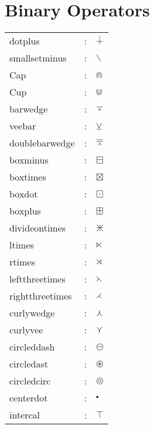 \documentclass{article}
\begin{document}
\section{Binary Operators} 
\begin{tabular}{lll} 
dotplus & : & $\dotplus$\\
smallsetminus & : & $\smallsetminus$\\
Cap & : & $\Cap$\\
Cup & : & $\Cup$\\
barwedge & : & $\barwedge$\\
veebar & : & $\veebar$\\
doublebarwedge & : & $\doublebarwedge$\\
boxminus & : & $\boxminus$\\
boxtimes & : & $\boxtimes$\\
boxdot & : & $\boxdot$\\
boxplus & : & $\boxplus$\\
divideontimes & : & $\divideontimes$\\
ltimes & : & $\ltimes$\\
rtimes & : & $\rtimes$\\
leftthreetimes & : & $\leftthreetimes$\\
rightthreetimes & : & $\rightthreetimes$\\
curlywedge & : & $\curlywedge$\\
curlyvee & : & $\curlyvee$\\
circleddash & : & $\circleddash$\\
circledast & : & $\circledast$\\
circledcirc & : & $\circledcirc$\\
centerdot & : & $\centerdot$\\
intercal & : & $\intercal$
\end{tabular}
\end{document}
